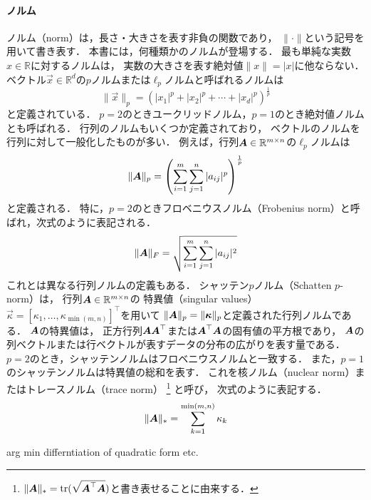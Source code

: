 \paragraph{ノルム}
ノルム（norm）は，長さ・大きさを表す非負の関数であり，
$\|\cdot\|$という記号を用いて書き表す．
本書には，何種類かのノルムが登場する．
%
最も単純な実数$x\in\mathbb{R}$に対するノルムは，
実数の大きさを表す絶対値$\|x\|=|x|$に他ならない．
%
ベクトル$\vec x\in\mathbb{R}^d$の$p$ノルムまたは$\ell_p$ノルムと呼ばれるノルムは
\[
 \|\vec x\|_p=\left(|x_1|^p+|x_2|^p+\cdots+|x_d|^p\right)^{\frac{1}{p}}
\]
と定義されている．
$p=2$のときユークリッドノルム，$p=1$のとき絶対値ノルムとも呼ばれる．
行列のノルムもいくつか定義されており，
ベクトルのノルムを行列に対して一般化したものが多い．
例えば，行列$\mbox{\boldmath $A$}\in\mathbb{R}^{m\times n}$の$\ell_p$ノルムは
\[
 \|\mbox{\boldmath $A$}\|_p=\left(\sum_{i=1}^m\sum_{j=1}^n|a_{ij}|^p\right)^{\frac{1}{p}}
\]
と定義される．
特に，$p=2$のときフロベニウスノルム（Frobenius norm）と呼ばれ，次式のように表記される．
\[
 \|\mbox{\boldmath $A$}\|_F=\sqrt{\sum_{i=1}^m\sum_{j=1}^n|a_{ij}|^2}
\]
これとは異なる行列ノルムの定義もある．
シャッテン$p$ノルム（Schatten $p$-norm）は，
行列$\mbox{\boldmath $A$}\in\mathbb{R}^{m\times n}$の
特異値（singular values）$\vec\kappa=[\kappa_1,\dots,\kappa_{\min(m,n)}]^\top$を用いて
$\|\mbox{\boldmath $A$}\|_p=\|\mbox{\boldmath $\kappa$}\|_p$と定義された行列ノルムである．
$\mbox{\boldmath $A$}$の特異値は，
正方行列$\mbox{\boldmath $A$}\mbox{\boldmath $A$}^\top$または$\mbox{\boldmath $A$}^\top\mbox{\boldmath $A$}$の固有値の平方根であり，
$\mbox{\boldmath $A$}$の列ベクトルまたは行ベクトルが表すデータの分布の広がりを表す量である．
$p=2$のとき，シャッテンノルムはフロベニウスノルムと一致する．
また，$p=1$のシャッテンノルムは特異値の総和を表す．
これを核ノルム（nuclear norm）またはトレースノルム（trace norm）
\footnote{$\|\mbox{\boldmath $A$}\|_*=\mathop{\textrm{tr}}\nolimits(\sqrt{\mbox{\boldmath $A$}^\top\mbox{\boldmath $A$}})$と書き表せることに由来する．}
と呼び，
次式のように表記する．
\[
 \|\mbox{\boldmath $A$}\|_*=\sum_{k=1}^{\min(m,n)}\kappa_k
\]


\iffalse

arg min
differntiation of quadratic form etc.





